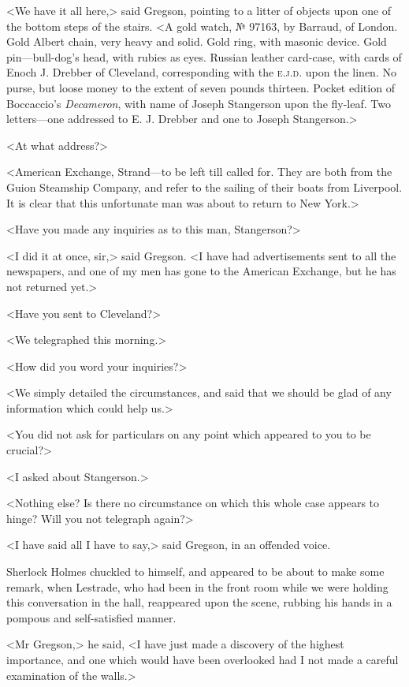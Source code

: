 <We have it all here,> said Gregson, pointing to a litter of objects upon one of the bottom steps of the stairs. <A gold watch, № 97163, by Barraud, of London. Gold Albert chain, very heavy and solid. Gold ring, with masonic device. Gold pin—bull-dog's head, with rubies as eyes. Russian leather card-case, with cards of Enoch J. Drebber of Cleveland, corresponding with the \textsc{e.j.d.} upon the linen. No purse, but loose money to the extent of seven pounds thirteen. Pocket edition of Boccaccio's \textit{Decameron}, with name of Joseph Stangerson upon the fly-leaf. Two letters—one addressed to E. J. Drebber and one to Joseph Stangerson.>

<At what address?>

<American Exchange, Strand—to be left till called for. They are both from the Guion Steamship Company, and refer to the sailing of their boats from Liverpool. It is clear that this unfortunate man was about to return to New York.>

<Have you made any inquiries as to this man, Stangerson?>

<I did it at once, sir,> said Gregson. <I have had advertisements sent to all the newspapers, and one of my men has gone to the American Exchange, but he has not returned yet.>

<Have you sent to Cleveland?>

<We telegraphed this morning.>

<How did you word your inquiries?>

<We simply detailed the circumstances, and said that we should be glad of any information which could help us.>

<You did not ask for particulars on any point which appeared to you to be crucial?>

<I asked about Stangerson.>

<Nothing else? Is there no circumstance on which this whole case appears to hinge? Will you not telegraph again?>

<I have said all I have to say,> said Gregson, in an offended voice.

Sherlock Holmes chuckled to himself, and appeared to be about to make some remark, when Lestrade, who had been in the front room while we were holding this conversation in the hall, reappeared upon the scene, rubbing his hands in a pompous and self-satisfied manner.

<Mr Gregson,> he said, <I have just made a discovery of the highest importance, and one which would have been overlooked had I not made a careful examination of the walls.>

